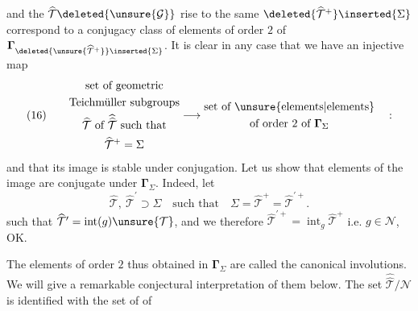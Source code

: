 

and the $\widehat{\mathcal{T}}\deleted{\unsure{\mathcal G}}$  rise to the same $\deleted{\widehat{\mathcal{T}}^{+}}\inserted{\Sigma}$ correspond  to a conjugacy class of elements of order $2$ of $\boldsymbol{\Gamma}_{\deleted{\unsure{\widehat{\mathcal{T}}^{+}}}\inserted{\Sigma}}$. It is clear  in any case that we have an injective map
\[
(16)\qquad
\begin{gathered}
\text{set of geometric}\\
\text{Teichmüller subgroups}\\
\widehat{\mathcal{T}}\text{ of }\widehat{\widehat{\mathcal{T}}}\text{ such that}\\
\widehat{\mathcal{T}}^{+}=\Sigma
\end{gathered}
\longrightarrow
\begin{gathered}
\text{set of }\unsure{\text{elements}|\text{elements}}\\
\text{of order }2\text{ of }\boldsymbol{\Gamma}_{\Sigma}
\end{gathered}
\quad :
\]
and that its image is stable under conjugation. Let us show that  elements of the image are conjugate under $\boldsymbol{\Gamma}_{\Sigma}$. Indeed, let
\[
\widehat{\mathcal{T}},\ \widehat{\mathcal{T}}^{\prime}\supset\Sigma
\quad\text{such that}\quad
\Sigma=\widehat{\mathcal{T}}^{+}=\widehat{\mathcal{T}}^{\prime+}.
\]
such that
$\widehat{\mathcal{T}}^{\prime}=\operatorname{int}(g)\unsure{\mathcal{T}}$,
and we  therefore
$\widehat{\mathcal{T}}^{\prime+}=\operatorname{int}_{g}\widehat{\mathcal{T}}^{+}$
i.e. $g\in\mathcal{N}$, OK.

The elements of order $2$ thus obtained in $\boldsymbol{\Gamma}_{\Sigma}$ are called the canonical involutions. We will give a remarkable conjectural interpretation of them below. The set $\widehat{\widehat{\mathcal{T}}}/\mathcal{N}$ is identified with the set of  of

